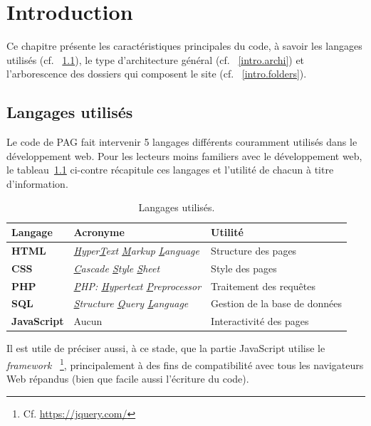 \chapter{Introduction}\label{intro}

Ce chapitre présente les caractéristiques principales du code, à savoir les langages utilisés
(cf. ~\ref{intro.langages}), le type d'architecture général (cf. ~\ref{intro.archi}) et 
l'arborescence des dossiers qui composent le site (cf. ~\ref{intro.folders}).

\section{Langages utilisés}\label{intro.langages}

Le code de PAG fait intervenir 5 langages différents couramment utilisés dans le développement 
web. Pour les lecteurs moins familiers avec le développement web, le 
tableau~\ref{intro.tab.langages} ci-contre récapitule ces langages et l'utilité de chacun à 
titre d'information.

\begin{table}[h]
\begin{center}
\begin{tabular}{|l|l|l|}
  \hline
  \textbf{Langage} & \textbf{Acronyme} & \textbf{Utilité} \\
  \hline
  \textbf{HTML} & \textit{\underline{H}yper\underline{T}ext \underline{M}arkup \underline{L}anguage} & Structure des pages\\
  \hline
  \textbf{CSS} & \textit{\underline{C}ascade \underline{S}tyle \underline{S}heet} & Style des pages\\
  \hline
  \textbf{PHP} & \textit{\underline{P}HP: \underline{H}ypertext \underline{P}reprocessor} & Traitement des requêtes\\
  \hline
  \textbf{SQL} & \textit{\underline{S}tructure \underline{Q}uery \underline{L}anguage} & Gestion de la base de données\\
  \hline
  \textbf{JavaScript} & Aucun & Interactivité des pages\\
  \hline
\end{tabular}
\end{center}
\vspace{-0.5cm}
\caption{Langages utilisés.}
\label{intro.tab.langages}
\end{table}

Il est utile de préciser aussi, à ce stade, que la partie JavaScript utilise le \textit{framework} 
\jquery~\footnote{Cf. \url{https://jquery.com/}}, principalement à des fins de compatibilité avec 
tous les navigateurs Web répandus (bien que \jquery facile aussi l'écriture du code).

